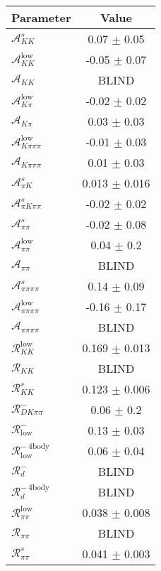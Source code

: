 \begin{table}[h]
  \centering
  \begin{tabular}{lc}
      \toprule
      Parameter & Value \\
      \midrule
      $\mathcal{A}_{KK}^s$ & 0.07 $\pm$ 0.05 \\
      $\mathcal{A}_{KK}^{\mathrm{low}}$ & -0.05 $\pm$ 0.07 \\
      $\mathcal{A}_{KK}$ & BLIND \\
      $\mathcal{A}_{K\pi}^{\mathrm{low}}$ & -0.02 $\pm$ 0.02 \\
      $\mathcal{A}_{K\pi}$ & 0.03 $\pm$ 0.03 \\
      $\mathcal{A}_{K\pi\pi\pi}^{\mathrm{low}}$ & -0.01 $\pm$ 0.03 \\
      $\mathcal{A}_{K\pi\pi\pi}$ & 0.01 $\pm$ 0.03 \\
      $\mathcal{A}_{\pi K}^s$ & 0.013 $\pm$ 0.016 \\
      $\mathcal{A}_{\pi K\pi\pi}^s$ & -0.02 $\pm$ 0.02 \\
      $\mathcal{A}_{\pi\pi}^s$ & -0.02 $\pm$ 0.08 \\
      $\mathcal{A}_{\pi\pi}^{\mathrm{low}}$ & 0.04 $\pm$ 0.2 \\
      $\mathcal{A}_{\pi\pi}$ & BLIND \\
      $\mathcal{A}_{\pi\pi\pi\pi}^s$ & 0.14 $\pm$ 0.09 \\
      $\mathcal{A}_{\pi\pi\pi\pi}^\mathrm{low}$ & -0.16 $\pm$ 0.17 \\
      $\mathcal{A}_{\pi\pi\pi\pi}$ & BLIND \\
      $\mathcal{R}_{KK}^\mathrm{low}$ & 0.169 $\pm$ 0.013 \\
      $\mathcal{R}_{KK}$ & BLIND \\
      $\mathcal{R}_{KK}^s$ & 0.123 $\pm$ 0.006 \\
      $\mathcal{R}_{DK\pi\pi}^-$ & 0.06 $\pm$ 0.2 \\
      $\mathcal{R}_\mathrm{low}^-$ & 0.13 $\pm$ 0.03 \\
      $\mathcal{R}_\mathrm{low}^{-\ \mathrm{4body}}$ & 0.06 $\pm$ 0.04 \\
      $\mathcal{R}_d^-$ & BLIND \\
      $\mathcal{R}_d^{-\ \mathrm{4body}}$ & BLIND \\
      $\mathcal{R}_{\pi\pi}^\mathrm{low}$ & 0.038 $\pm$ 0.008 \\
      $\mathcal{R}_{\pi\pi}$ & BLIND \\
      $\mathcal{R}_{\pi\pi}^s$ & 0.041 $\pm$ 0.003 \\

\end{tabular}
\end{table}
